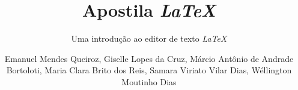 \documentclass[graybox,envcountchap,sectrefs]{svmono}
\begin{document}
\author{Emanuel Mendes Queiroz, Giselle Lopes da Cruz, M\'arcio Ant\^onio de Andrade Bortoloti, Maria Clara Brito dos Reis, Samara Viriato Vilar Dias, Wéllington Moutinho Dias}
\title{Apostila \textit{LaTeX}}
\subtitle{Uma introdu\c c\~ao ao editor de texto \textit{LaTeX}}
\maketitle

\frontmatter%



\tableofcontents

\mainmatter%









\backmatter%
% 
% 

\end{document}
